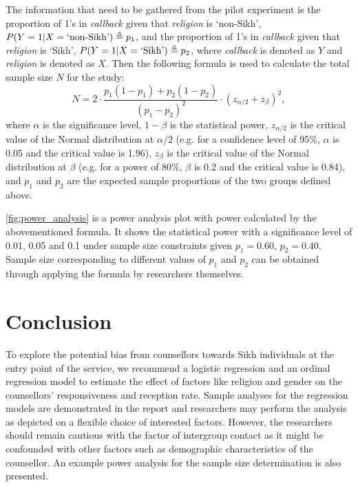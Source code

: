 \documentclass[11pt]{article}
\begin{document}
The information that need to be gathered from the pilot experiment is the proportion of 1's in 
\textit{callback} given that \textit{religion} is `non-Sikh', $P(Y=1|X=\textnormal{`non-Sikh'}) \triangleq p_1$, and the proportion of 1's in  \textit{callback} given that \textit{religion} is `Sikh', $P(Y=1|X=\textnormal{`Sikh'}) \triangleq p_2$, where \textit{callback} is denoted as $Y$ and \textit{religion} is denoted as $X$. Then the following formula is used to calculate the total sample size $N$ for the study:
\begin{equation}
    N = 2\cdot \frac{p_1(1-p_1)+p_2(1-p_2)}{(p_1-p_2)^2} \cdot (z_{\alpha/2}+z_\beta)^2 ,
\end{equation}
where $\alpha$ is the significance level, $1-\beta$ is the statistical power, $z_{\alpha/2}$ is the critical value of the Normal distribution at $\alpha/2$ (e.g. for a confidence level of 95\%, $\alpha$ is 0.05 and the critical value is 1.96), $z_\beta$ is the critical value of the Normal distribution at $\beta$ (e.g. for a power of 80\%, $\beta$ is 0.2 and the critical value is 0.84), and $p_1$ and $p_2$ are the expected sample proportions of the two groups defined above.

\autoref{fig:power_analysis} is a power analysis plot with power calculated by the abovementioned formula. It shows the statistical power with a significance level of 0.01, 0.05 and 0.1 under sample size constraints given $p_1=0.60$, $p_2=0.40$. Sample size corresponding to different values of $p_1$ and $p_2$ can be obtained through applying the formula by researchers themselves.


\section{Conclusion}
To explore the potential bias from counsellors towards Sikh individuals at the entry point of the service, we recommend a logistic regression and an ordinal regression model to estimate the effect of factors like religion and gender on the counsellors' responsiveness and reception rate. Sample analyses for the regression models are demonstrated in the report and researchers may perform the analysis as depicted on a flexible choice of interested factors. However, the researchers should remain cautious with the factor of intergroup contact as it might be confounded with other factors such as demographic characteristics of the counsellor. An example power analysis for the sample size determination is also presented. 
\end{document}
